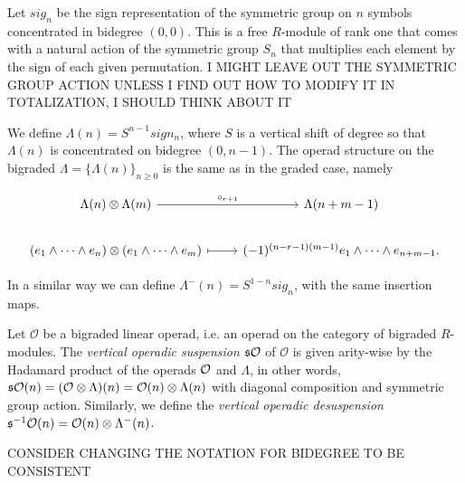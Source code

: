 \documentclass[twoside]{article}
\begin{document}

Let $sig_n$ be the sign representation of the symmetric group on $n$ symbols concentrated in bidegree $(0,0)$. This is a free $R$-module of rank one that comes with a natural action of the symmetric group $S_n$ that multiplies each element by the sign of each given permutation. I MIGHT LEAVE OUT THE SYMMETRIC GROUP  ACTION UNLESS I FIND OUT HOW TO MODIFY IT IN TOTALIZATION, I SHOULD THINK ABOUT IT

We define $\Lambda(n)=S^{n-1}sign_n$, where  $S$ is a vertical shift of degree so that $\Lambda(n)$ is concentrated on bidegree  $(0,n-1)$.
The operad structure on the bigraded $\Lambda=\{\Lambda(n)\}_{n\geq 0}$ is the same as in the graded case, namely

\[
\begin{tikzcd}
\Lambda(n)\otimes\Lambda(m) \arrow[r, "\circ_{r+1}"] & \Lambda(n+m-1)\\
(e_1\land\cdots\land e_n)\otimes(e_1\land\cdots\land e_m)\arrow[r, mapsto] & (-1)^{(n-r-1)(m-1)}e_1\land\cdots\land e_{n+m-1}.
\end{tikzcd}
\]



In a similar way we can define $\Lambda^-(n)=S^{1-n}sig_n$, with the same insertion maps.
\begin{definition}
Let $\mathcal{O}$ be a bigraded linear operad, i.e. an operad on the category of bigraded $R$-modules. The \emph{vertical operadic suspension} $\mathfrak{s}{\mathcal O}$ of $\mathcal{O}$ is given arity-wise by the Hadamard product of the operads ${\mathcal O}$ and $\Lambda$, in other words, $\mathfrak{s}{\mathcal O}(n)=(\mathcal{O}\otimes\Lambda)(n)=\mathcal{O}(n)\otimes\Lambda(n)$ with diagonal composition and symmetric group action. Similarly, we define the \emph{vertical operadic desuspension} $\mathfrak{s}^{-1}{\mathcal O}(n)=\mathcal{O}(n)\otimes\Lambda^-(n)$. %
\end{definition}

CONSIDER CHANGING THE NOTATION FOR BIDEGREE TO BE CONSISTENT
\end{document}
